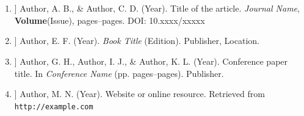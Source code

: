\section*{}
\begin{enumerate}
	\item[[1]] Author, A. B., \& Author, C. D. (Year). Title of the article. \textit{Journal Name}, \textbf{Volume}(Issue), pages--pages. DOI: 10.xxxx/xxxxx
	
	\item[[2]] Author, E. F. (Year). \textit{Book Title} (Edition). Publisher, Location.
	
	\item[[3]] Author, G. H., Author, I. J., \& Author, K. L. (Year). Conference paper title. In \textit{Conference Name} (pp. pages--pages). Publisher.
	
	\item[[4]] Author, M. N. (Year). Website or online resource. Retrieved from \texttt{http://example.com}
\end{enumerate}
